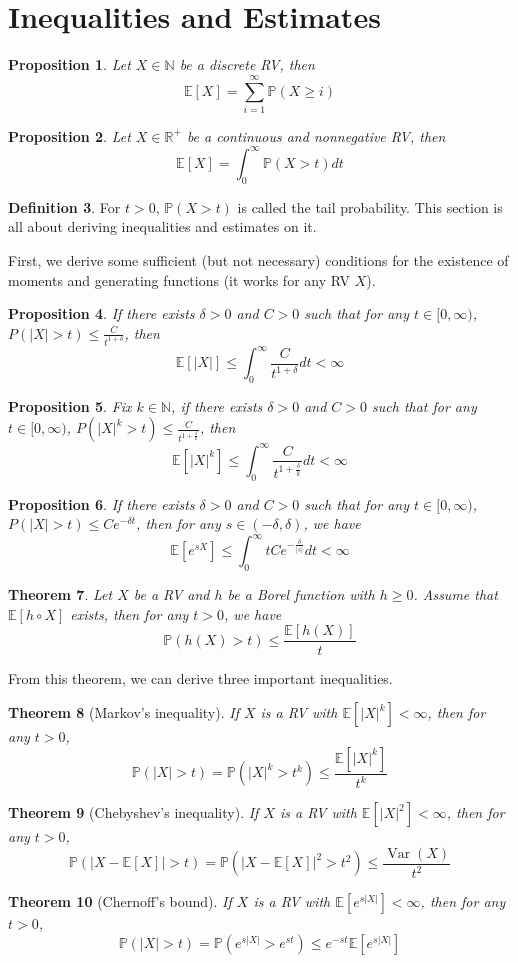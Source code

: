 \documentclass[paper=a4, fontsize=12pt]{scrartcl} %
\newtheorem{thm}{Theorem}[section]
\newtheorem{prop}[thm]{Proposition}
\theoremstyle{definition}
\newtheorem{defn}[thm]{Definition}
\theoremstyle{remark}
\newcommand{\R}{\mathbb{R}}
\newcommand{\N}{\mathbb{N}}
\newcommand{\E}{\mathbb{E}}
\renewcommand{\P}{\mathbb{P}}
\DeclareMathOperator{\vari}{Var}
\numberwithin{equation}{section} %
\numberwithin{figure}{section} %
\numberwithin{table}{section} %
\begin{document}
\section{Inequalities and Estimates}
\begin{prop}
	Let $X \in \N$ be a discrete RV, then $$\E[X] = \sum_{i=1}^{\infty}\P(X \geq i)$$
\end{prop}
\begin{prop}
	Let $X \in \R^+$ be a continuous and nonnegative RV, then $$\E[X] = \int_{0}^{\infty}\P(X > t)dt$$
\end{prop}
\begin{defn}
	For $t > 0$, $\P(X> t)$ is called the tail probability. This section is all about deriving inequalities and estimates on it.
\end{defn}
First, we derive some sufficient (but not necessary) conditions for the existence of moments and generating functions (it works for any RV $X$).
\begin{prop}
	If there exists $\delta > 0$ and $C > 0$ such that for any $t \in [0,\infty)$, $P(|X| > t) \leq \frac{C}{t^{1+\delta}}$, then \[ \E[|X|] \leq \int_{0}^{\infty}\frac{C}{t^{1+\delta}}dt < \infty \]
\end{prop}
\begin{prop}
	Fix $k \in \N$, if there exists $\delta > 0$ and $C > 0$ such that for any $t \in [0,\infty)$, $P(|X|^k > t) \leq \frac{C}{t^{1+\frac{\delta}{k}}}$, then \[ \E[|X|^k] \leq \int_{0}^{\infty}\frac{C}{t^{1+\frac{\delta}{k}}}dt < \infty \]
\end{prop}
\begin{prop}
	If there exists $\delta > 0$ and $C > 0$ such that for any $t \in [0,\infty)$, $P(|X| > t) \leq Ce^{-\delta t}$, then for any $s \in (-\delta, \delta)$, we have \[ \E[e^{sX}] \leq \int_{0}^{\infty}tCe^{-\frac{\delta}{|s|}}dt < \infty \]
\end{prop}
\begin{thm}
	Let $X$ be a RV and $h$ be a Borel function with $h \geq 0$. Assume that $\E[h \circ X]$ exists, then for any $t > 0$, we have
	\[ \P(h(X) > t) \leq \frac{\E[h(X)]}{t} \]
\end{thm}
From this theorem, we can derive three important inequalities.
\begin{thm}[Markov's inequality]
	If $X$ is a RV with $\E[|X|^k] <\infty$, then for any $t > 0$,
	\[ \P(|X| > t) = \P(|X|^k > t^k) \leq \frac{\E[|X|^k]}{t^k} \]
\end{thm}
\begin{thm}[Chebyshev's inequality]
	If $X$ is a RV with $\E[|X|^2] <\infty$, then for any $t > 0$,
	\[ \P(|X-\E[X]| > t) = \P(|X-\E[X]|^2 > t^2) \leq \frac{\vari(X)}{t^2} \]
\end{thm}
\begin{thm}[Chernoff's bound]
	If $X$ is a RV with $\E[e^{s|X|}] <\infty$, then for any $t > 0$,
	\[ \P(|X| > t) = \P(e^{s|X|} > e^{st}) \leq e^{-st}\E[e^{s|X|}] \]
\end{thm}
\end{document}
